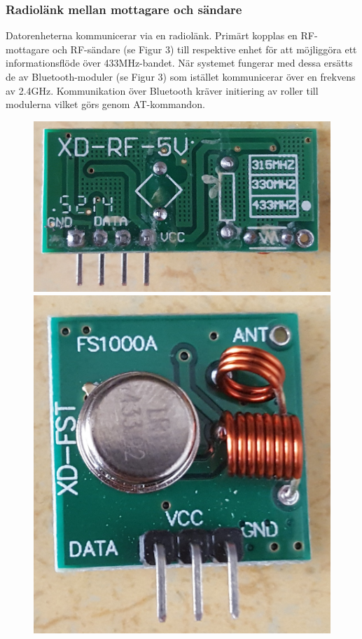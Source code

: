 \documentclass[a4paper]{article}
\begin{document}
\subsubsection{Radiolänk mellan mottagare och sändare}
Datorenheterna kommunicerar via en radiolänk. Primärt kopplas en RF-mottagare och RF-sändare (se Figur 3) till respektive enhet för att möjliggöra ett informationsflöde över 433MHz-bandet. När systemet fungerar med dessa ersätts de av Bluetooth-moduler (se Figur 3) som istället kommunicerar över en frekvens av 2.4GHz. Kommunikation över Bluetooth kräver initiering av roller till modulerna vilket görs genom AT-kommandon.



\begin{figure}[H]
\centering
\includegraphics[scale=0.048]{RF-transmitter.jpg}
\includegraphics[scale=0.04]{RF-receiver.jpg} \\ \vspace{2mm}

\end{figure}
\end{document}

